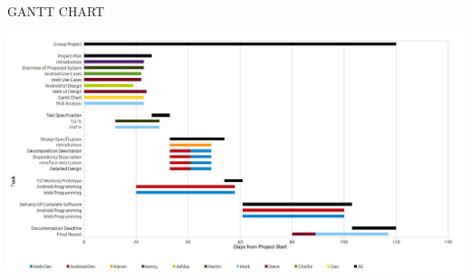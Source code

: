 \documentclass{article}
\begin{document}
	\newpage
	\begin{section}{GANTT CHART}
		\begin{center}
		\includegraphics[height=0.69\columnwidth, angle=90]{images/GanttChart/Gantt_Chart.jpg}
		\end{center}
	\end{section}
	
\end{document}
